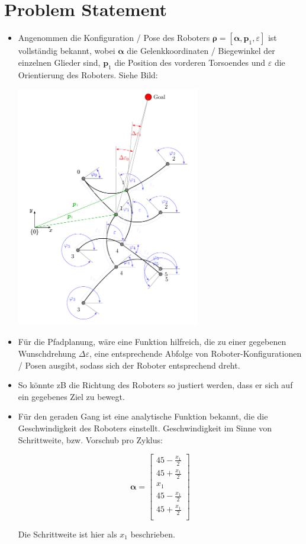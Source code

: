 \documentclass[10pt,a4paper]{article}
\author{Lars Schiller}
\begin{document}
\section{Problem Statement}

\begin{itemize}


\item Angenommen die Konfiguration / Pose des Roboters $\bm{\rho} = [\bm{\alpha}, \bm{p}_1, \varepsilon]$ ist vollständig bekannt, wobei $\bm{\alpha}$ die Gelenkkoordinaten / Biegewinkel der einzelnen Glieder sind, $\bm{p}_1$ die Position des vorderen Torsoendes und $\varepsilon$ die Orientierung des Roboters.
Siehe Bild:

\includegraphics[width=8cm]{model.pdf}


\item Für die Pfadplanung, wäre eine Funktion hilfreich, die zu einer gegebenen Wunschdrehung $\Delta \varepsilon$, eine entsprechende Abfolge von Roboter-Konfigurationen / Posen ausgibt, sodass sich der Roboter entsprechend dreht.

\item So könnte zB die Richtung des Roboters so justiert werden, dass er sich auf ein gegebenes Ziel zu bewegt.


\item Für den geraden Gang ist eine analytische Funktion bekannt, die die Geschwindigkeit des Roboters einstellt. Geschwindigkeit im Sinne von Schrittweite, bzw. Vorschub pro Zyklus:

\begin{equation}
\bm{\alpha} = \begin{bmatrix}
45 - \frac{x_1}{2} \\
45 + \frac{x_1}{2} \\
x_1 \\
45 - \frac{x_1}{2}  \\
45 + \frac{x_1}{2} \\
\end{bmatrix}
\end{equation}

Die Schrittweite ist hier als $x_1$ beschrieben.

\end{itemize}
\end{document}
